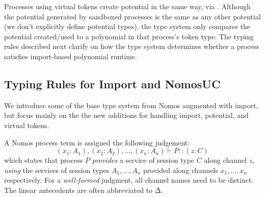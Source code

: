 Processes using virtual tokens create potential in the same way, via \inline{$\ngenpot$}. 
Although the potential generated by sandboxed processes is the same as any other potential (we don't explicitly define potential types), the type system only compares the potential created/used to a polynomial in that process's token type. 
The typing rules described next clarify on how the type system determines whether a process satisfies import-based polynomial runtime.





\subsection{Typing Rules for Import and NomosUC}
We introduce some of the base type system from Nomos augmented with import, but focus mainly on the the new additions for handling import, potential, and virtual tokens. 

A Nomos process term is assigned the following judgement: 
\[
(x_1 : A_1), (x_2 : A_2), \ldots, (x_n : A_n) \vdash P :: (z : C)
\]
which states that process $P$ \emph{provides} a service
of session type $C$ along channel $z$, \emph{using} the services of session
types $A_1, \ldots, A_n$ provided along channels $x_1, \ldots, x_n$ respectively.
For a \emph{well-formed} judgment, all channel names need to be distinct.
The linear antecedents are often abbreviated to $\Delta$.

